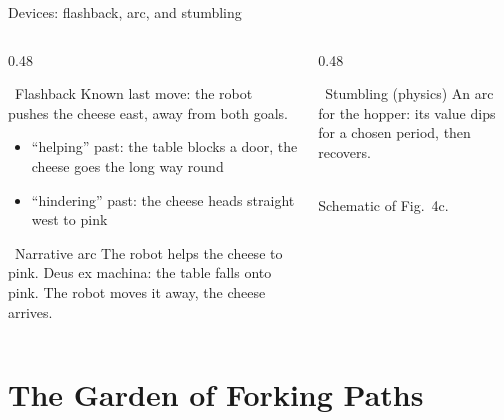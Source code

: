 \documentclass[aspectratio=169,10pt]{beamer}
\newcommand{\tightitem}{\itemsep0.3em}
\begin{document}
\begin{frame}{Devices: flashback, arc, and stumbling}
\begin{columns}[T,onlytextwidth]

\begin{column}{0.48\textwidth}
\begin{block}{\faHistory\ Flashback}
Known last move: the robot pushes the cheese east, away from both goals.
\begin{itemize}\tightitem
  \item ``helping'' past: the table blocks a door, the cheese goes the long way round
  \item ``hindering'' past: the cheese heads straight west to pink
\end{itemize}
\end{block}
\begin{block}{\faChartLine\ Narrative arc}
The robot helps the cheese to pink. \alert{Deus ex machina}: the table falls onto pink. The robot moves it away, the cheese arrives.
\end{block}
\end{column}

\begin{column}{0.48\textwidth}
\begin{block}{\faRunning\ Stumbling (physics)}
An arc for the hopper: its value dips for a chosen period, then recovers.
\centering
{}\\
{\scriptsize\color{gray}Schematic of Fig.~4c.}
\end{block}
\end{column}

\end{columns}
\end{frame}

\section{The Garden of Forking Paths}
\end{document}
